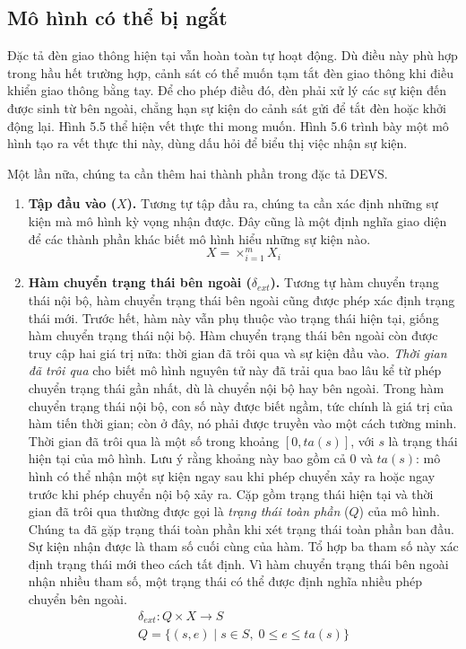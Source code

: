\subsection{Mô hình có thể bị ngắt}
Đặc tả đèn giao thông hiện tại vẫn hoàn toàn tự hoạt động. Dù điều này phù hợp trong hầu hết trường hợp, cảnh sát có thể muốn tạm tắt đèn giao thông khi điều khiển giao thông bằng tay. Để cho phép điều đó, đèn phải xử lý các sự kiện đến được sinh từ bên ngoài, chẳng hạn sự kiện do cảnh sát gửi để tắt đèn hoặc khởi động lại. Hình 5.5 thể hiện vết thực thi mong muốn. Hình 5.6 trình bày một mô hình tạo ra vết thực thi này, dùng dấu hỏi để biểu thị việc nhận sự kiện.

Một lần nữa, chúng ta cần thêm hai thành phần trong đặc tả DEVS.
\begin{enumerate}
\item \textbf{Tập đầu vào ($X$).} Tương tự tập đầu ra, chúng ta cần xác định những sự kiện mà mô hình kỳ vọng nhận được. Đây cũng là một định nghĩa giao diện để các thành phần khác biết mô hình hiểu những sự kiện nào.
\[
X=\times_{i=1}^{m}X_i
\]
\item \textbf{Hàm chuyển trạng thái bên ngoài ($\delta_{ext}$).} Tương tự hàm chuyển trạng thái nội bộ, hàm chuyển trạng thái bên ngoài cũng được phép xác định trạng thái mới. Trước hết, hàm này vẫn phụ thuộc vào trạng thái hiện tại, giống hàm chuyển trạng thái nội bộ. Hàm chuyển trạng thái bên ngoài còn được truy cập hai giá trị nữa: thời gian đã trôi qua và sự kiện đầu vào. \emph{Thời gian đã trôi qua} cho biết mô hình nguyên tử này đã trải qua bao lâu kể từ phép chuyển trạng thái gần nhất, dù là chuyển nội bộ hay bên ngoài. Trong hàm chuyển trạng thái nội bộ, con số này được biết ngầm, tức chính là giá trị của hàm tiến thời gian; còn ở đây, nó phải được truyền vào một cách tường minh. Thời gian đã trôi qua
là một số trong khoảng $[0,ta(s)]$, với $s$ là trạng thái hiện tại của mô hình. Lưu ý rằng khoảng này bao gồm cả $0$ và $ta(s)$: mô hình có thể nhận một sự kiện ngay sau khi phép chuyển xảy ra hoặc ngay trước khi phép chuyển nội bộ xảy ra. Cặp gồm trạng thái hiện tại và thời gian đã trôi qua thường được gọi là \emph{trạng thái toàn phần} ($Q$) của mô hình. Chúng ta đã gặp trạng thái toàn phần khi xét trạng thái toàn phần ban đầu. Sự kiện nhận được là tham số cuối cùng của hàm. Tổ hợp ba tham số này xác định trạng thái mới theo cách tất định. Vì hàm chuyển trạng thái bên ngoài nhận nhiều tham số, một trạng thái có thể được định nghĩa nhiều phép chuyển bên ngoài.
\begin{gather*}
\delta_{ext}:Q\times X\rightarrow S\\
Q=\{(s,e)\mid s\in S,\;0\leq e\leq ta(s)\}
\end{gather*}
\end{enumerate}

